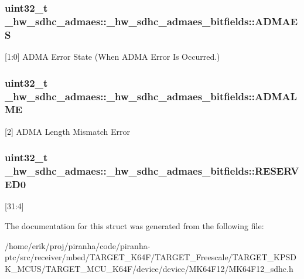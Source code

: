 \subsubsection[{\texorpdfstring{A\+D\+M\+A\+ES}{ADMAES}}]{\setlength{\rightskip}{0pt plus 5cm}uint32\+\_\+t \+\_\+hw\+\_\+sdhc\+\_\+admaes\+::\+\_\+hw\+\_\+sdhc\+\_\+admaes\+\_\+bitfields\+::\+A\+D\+M\+A\+ES}\hypertarget{struct__hw__sdhc__admaes_1_1__hw__sdhc__admaes__bitfields_ab6891f6f5fcbe28395e8b03a6591702c}{}\label{struct__hw__sdhc__admaes_1_1__hw__sdhc__admaes__bitfields_ab6891f6f5fcbe28395e8b03a6591702c}
\mbox{[}1\+:0\mbox{]} A\+D\+MA Error State (When A\+D\+MA Error Is Occurred.) 
\subsubsection[{\texorpdfstring{A\+D\+M\+A\+L\+ME}{ADMALME}}]{\setlength{\rightskip}{0pt plus 5cm}uint32\+\_\+t \+\_\+hw\+\_\+sdhc\+\_\+admaes\+::\+\_\+hw\+\_\+sdhc\+\_\+admaes\+\_\+bitfields\+::\+A\+D\+M\+A\+L\+ME}\hypertarget{struct__hw__sdhc__admaes_1_1__hw__sdhc__admaes__bitfields_a0192847aa5b6999a3dcb1e65b528e9fa}{}\label{struct__hw__sdhc__admaes_1_1__hw__sdhc__admaes__bitfields_a0192847aa5b6999a3dcb1e65b528e9fa}
\mbox{[}2\mbox{]} A\+D\+MA Length Mismatch Error 
\subsubsection[{\texorpdfstring{R\+E\+S\+E\+R\+V\+E\+D0}{RESERVED0}}]{\setlength{\rightskip}{0pt plus 5cm}uint32\+\_\+t \+\_\+hw\+\_\+sdhc\+\_\+admaes\+::\+\_\+hw\+\_\+sdhc\+\_\+admaes\+\_\+bitfields\+::\+R\+E\+S\+E\+R\+V\+E\+D0}\hypertarget{struct__hw__sdhc__admaes_1_1__hw__sdhc__admaes__bitfields_abe6319e731d6754ab2edb8e6664bb68b}{}\label{struct__hw__sdhc__admaes_1_1__hw__sdhc__admaes__bitfields_abe6319e731d6754ab2edb8e6664bb68b}
\mbox{[}31\+:4\mbox{]} 

The documentation for this struct was generated from the following file\+:\begin{DoxyCompactItemize}
\item 
/home/erik/proj/piranha/code/piranha-\/ptc/src/receiver/mbed/\+T\+A\+R\+G\+E\+T\+\_\+\+K64\+F/\+T\+A\+R\+G\+E\+T\+\_\+\+Freescale/\+T\+A\+R\+G\+E\+T\+\_\+\+K\+P\+S\+D\+K\+\_\+\+M\+C\+U\+S/\+T\+A\+R\+G\+E\+T\+\_\+\+M\+C\+U\+\_\+\+K64\+F/device/device/\+M\+K64\+F12/M\+K64\+F12\+\_\+sdhc.\+h\end{DoxyCompactItemize}

